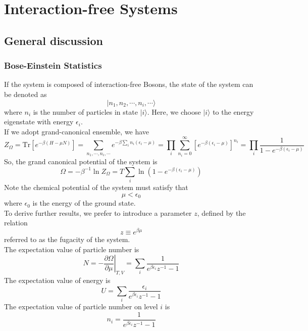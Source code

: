 \documentclass[cyan]{elegantnote}
\begin{document}
\chapter{Interaction-free Systems}
\section{General discussion}
\subsection{Bose-Einstein Statistics}
If the system is composed of interaction-free Bosons, the state of the system can be denoted as
\[|n_1,n_2,\cdots,n_i,\cdots\rangle\]
where $n_i$ is the number of particles in state $|i\rangle$. Here, we choose $|i\rangle$ to the energy eigenstate with energy $\epsilon_i$. 
\\
If we adopt grand-canonical ensemble, we have
\[Z_{\Omega} = \mathrm{Tr}[e^{-\beta(H-\mu N)}] = \sum_{n_1,\cdots,n_i,\cdots} e^{-\beta \sum_{i}n_i(\epsilon_i-\mu)} = \prod_{i}\sum_{n_i=0}^{\infty}[e^{-\beta(\epsilon_i-\mu)}]^{n_i} = \prod_{i} \frac{1}{1-e^{-\beta(\epsilon_i - \mu)}}\]
So, the grand canonical potential of the system is
\[\Omega = -\beta^{-1}\ln Z_{\Omega} = T \sum_i \ln (1 - e^{-\beta(\epsilon_i - \mu)})\]
Note the chemical potential of the system must satisfy that
\[\mu < \epsilon_0\] where $\epsilon_0$ is the energy of the ground state.
\\
To derive further results, we prefer to introduce a parameter $z$, defined by the relation
\[z  \equiv e^{\beta \mu}\] referred to as the fugacity of the system.
\\
The expectation value of particle number is
\[N = - \left. \frac{\partial \Omega}{\partial \mu} \right|_{T,V} = \sum_i \frac{1}{e^{\beta \epsilon_i}z^{-1}-1}\]
The expectation value of energy is
\[U = \sum_i \frac{\epsilon_i}{e^{\beta \epsilon_i}z^{-1}-1}\]
The expectation value of particle number on level $i$ is
\[n_i =  \frac{1}{e^{\beta \epsilon_i}z^{-1}-1}\]
\end{document}
